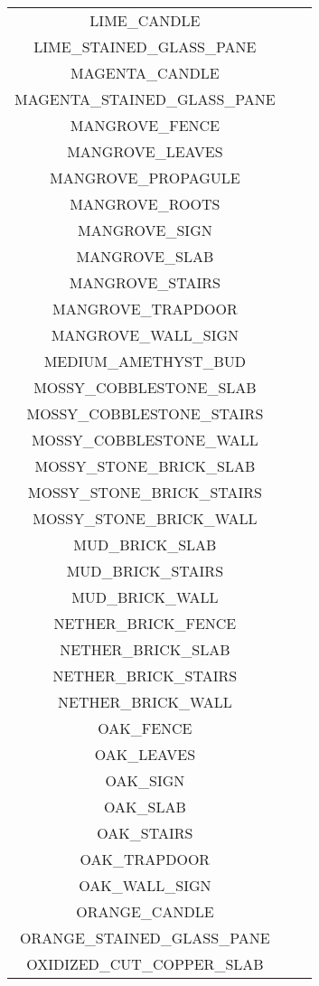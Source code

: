 \documentclass[11pt]{article}
\newcommand{\xmark}{\ding{55}}%
\begin{document}
\begin{longtable}{ |c|c|c| }
	LIME\_CANDLE & \xmark \\
	LIME\_STAINED\_GLASS\_PANE & \xmark \\
	MAGENTA\_CANDLE & \xmark \\
	MAGENTA\_STAINED\_GLASS\_PANE & \xmark \\
	MANGROVE\_FENCE & \xmark \\
	MANGROVE\_LEAVES & \xmark \\
	MANGROVE\_PROPAGULE & \xmark \\
	MANGROVE\_ROOTS & \xmark \\
	MANGROVE\_SIGN & \xmark \\
	MANGROVE\_SLAB & \xmark \\
	MANGROVE\_STAIRS & \xmark \\
	MANGROVE\_TRAPDOOR & \xmark \\
	MANGROVE\_WALL\_SIGN & \xmark \\
	MEDIUM\_AMETHYST\_BUD & \xmark \\
	MOSSY\_COBBLESTONE\_SLAB & \xmark \\
	MOSSY\_COBBLESTONE\_STAIRS & \xmark \\
	MOSSY\_COBBLESTONE\_WALL & \xmark \\
	MOSSY\_STONE\_BRICK\_SLAB & \xmark \\
	MOSSY\_STONE\_BRICK\_STAIRS & \xmark \\
	MOSSY\_STONE\_BRICK\_WALL & \xmark \\
	MUD\_BRICK\_SLAB & \xmark \\
	MUD\_BRICK\_STAIRS & \xmark \\
	MUD\_BRICK\_WALL & \xmark \\
	NETHER\_BRICK\_FENCE & \xmark \\
	NETHER\_BRICK\_SLAB & \xmark \\
	NETHER\_BRICK\_STAIRS & \xmark \\
	NETHER\_BRICK\_WALL & \xmark \\
	OAK\_FENCE & \xmark \\
	OAK\_LEAVES & \xmark \\
	OAK\_SIGN & \xmark \\
	OAK\_SLAB & \xmark \\
	OAK\_STAIRS & \xmark \\
	OAK\_TRAPDOOR & \xmark \\
	OAK\_WALL\_SIGN & \xmark \\
	ORANGE\_CANDLE & \xmark \\
	ORANGE\_STAINED\_GLASS\_PANE & \xmark \\
	OXIDIZED\_CUT\_COPPER\_SLAB & \xmark \\

\end{longtable}
\end{document}
